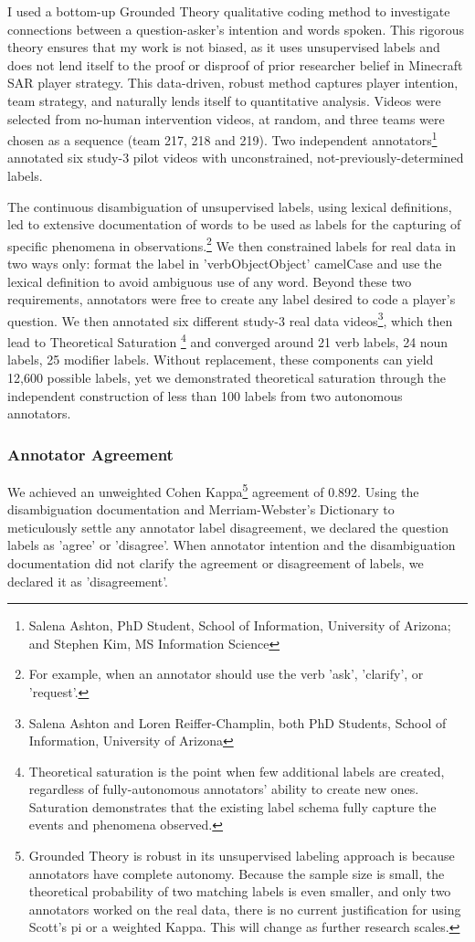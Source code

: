 I used a bottom-up Grounded Theory qualitative coding method to investigate connections between a question-asker's intention and words spoken. This
rigorous theory ensures that my work is not biased, as it uses unsupervised
labels and does not lend itself to the proof or disproof of prior researcher
belief in Minecraft SAR player strategy. This data-driven, robust method
captures player intention, team strategy, and naturally lends itself to
quantitative analysis. Videos were selected from no-human intervention videos,
at random, and three teams were chosen as a sequence (team 217, 218 and 219).
Two independent annotators\footnote{Salena Ashton, PhD Student, School of Information, University of Arizona; and Stephen Kim, MS Information Science} annotated six study-3 pilot
videos with unconstrained, not-previously-determined labels. 

The continuous disambiguation
of unsupervised labels, using lexical definitions, led to extensive
documentation of words to be used as labels for the capturing of specific
phenomena in observations.\footnote{For example, when an annotator should use
the verb 'ask', 'clarify', or 'request'.} We then constrained labels for real
data in two ways only: format the label in 'verbObjectObject' camelCase and use
the lexical definition to avoid ambiguous use of any word. Beyond these two
requirements, annotators were free to create any label desired to code a
player's question. We then annotated six different study-3 real data
videos\footnote{Salena Ashton and Loren Reiffer-Champlin, both PhD Students, School of Information, University of Arizona}, which then lead to Theoretical
Saturation \footnote{Theoretical saturation is the point when few additional
labels are created, regardless of fully-autonomous annotators' ability to
create new ones. Saturation demonstrates that the existing label schema fully
capture the events and phenomena observed.} and converged around 21 verb
labels, 24 noun labels, 25 modifier labels. Without replacement, these
components can yield 12,600 possible labels, yet we demonstrated theoretical
saturation through the independent construction of less than 100 labels from
two autonomous annotators.


\subsubsection{Annotator Agreement}
We achieved an unweighted Cohen Kappa\footnote{Grounded Theory is robust in its
unsupervised labeling approach is because annotators have complete autonomy.
Because the sample size is small, the theoretical probability of two matching
labels is even smaller, and only two annotators worked on the real data, there
is no current justification for using Scott's pi or a weighted Kappa. This will
change as further research scales.} agreement of 0.892. Using the
disambiguation documentation and Merriam-Webster's Dictionary to meticulously
settle any annotator label disagreement, we declared the question labels as
'agree' or 'disagree'. When annotator intention and the disambiguation
documentation did not clarify the agreement or disagreement of labels, we
declared it as 'disagreement'. 


